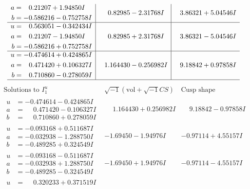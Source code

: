 \documentclass[1p]{elsarticle_modified}
\theoremstyle{definition}
\newcommand{\I}{\sqrt{-1}}
\begin{document}
$$\begin{array}{c|c|c}
\begin{aligned}
a &= \phantom{-}0.21207 + 1.94850 I \\
b &= -0.586216 - 0.752758 I\end{aligned}
 & \phantom{-}0.82985 - 2.31768 I & \phantom{-}3.86321 + 5.04546 I \\ \hline\begin{aligned}
u &= \phantom{-}0.563051 - 0.342434 I \\
a &= \phantom{-}0.21207 - 1.94850 I \\
b &= -0.586216 + 0.752758 I\end{aligned}
 & \phantom{-}0.82985 + 2.31768 I & \phantom{-}3.86321 - 5.04546 I \\ \hline\begin{aligned}
u &= -0.474614 + 0.424865 I \\
a &= \phantom{-}0.471420 + 0.106327 I \\
b &= \phantom{-}0.710860 - 0.278059 I\end{aligned}
 & \phantom{-}1.164430 - 0.256982 I & \phantom{-}9.18842 + 0.97858 I\\
 \hline 
 \end{array}$$\newpage$$\begin{array}{c|c|c}  
\text{Solutions to }I^u_{1}& \I (\text{vol} + \sqrt{-1}CS) & \text{Cusp shape}\\
 \hline 
\begin{aligned}
u &= -0.474614 - 0.424865 I \\
a &= \phantom{-}0.471420 - 0.106327 I \\
b &= \phantom{-}0.710860 + 0.278059 I\end{aligned}
 & \phantom{-}1.164430 + 0.256982 I & \phantom{-}9.18842 - 0.97858 I \\ \hline\begin{aligned}
u &= -0.093168 + 0.511687 I \\
a &= -0.032938 - 1.288750 I \\
b &= -0.489285 + 0.324549 I\end{aligned}
 & -1.69450 - 1.94976 I & -0.97114 + 4.55157 I \\ \hline\begin{aligned}
u &= -0.093168 - 0.511687 I \\
a &= -0.032938 + 1.288750 I \\
b &= -0.489285 - 0.324549 I\end{aligned}
 & -1.69450 + 1.94976 I & -0.97114 - 4.55157 I \\ \hline\begin{aligned}
u &= \phantom{-}0.320233 + 0.371519 I \\

\end{aligned}
\end{array}$$
\end{document}
